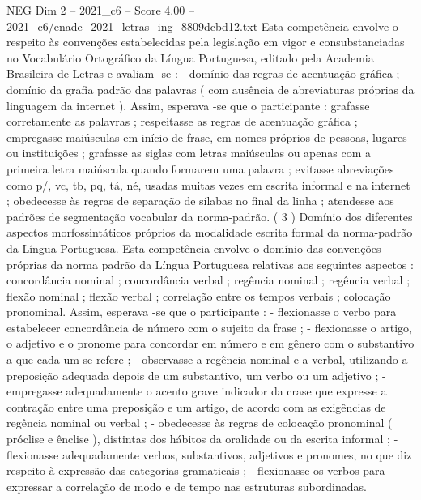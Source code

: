 \begin{textsample}{NEG Dim 2 – 2021\_c6 – Score 4.00 – 2021\_c6/enade\_2021\_letras\_ing\_8809dcbd12.txt}
Esta competência envolve o respeito às convenções estabelecidas pela legislação em vigor e consubstanciadas no Vocabulário Ortográfico da Língua Portuguesa, editado pela Academia Brasileira de Letras e avaliam -se : - domínio das regras de acentuação gráfica ; - domínio da grafia padrão das palavras ( com ausência de abreviaturas próprias da linguagem da internet ).
Assim, esperava -se que o participante : grafasse corretamente as palavras ; respeitasse as regras de acentuação gráfica ; empregasse maiúsculas em início de frase, em nomes próprios de pessoas, lugares ou instituições ; grafasse as siglas com letras maiúsculas ou apenas com a primeira letra maiúscula quando formarem uma palavra ; evitasse abreviações como p/, vc, tb, pq, tá, né, usadas muitas vezes em escrita informal e na internet ; obedecesse às regras de separação de sílabas no final da linha ; atendesse aos padrões de segmentação vocabular da norma-padrão. ( 3 ) Domínio dos diferentes aspectos morfossintáticos próprios da modalidade escrita formal da norma-padrão da Língua Portuguesa.
Esta competência envolve o domínio das convenções próprias da norma padrão da Língua Portuguesa relativas aos seguintes aspectos : concordância nominal ; concordância verbal ; regência nominal ; regência verbal ; flexão nominal ; flexão verbal ; correlação entre os tempos verbais ; colocação pronominal.
Assim, esperava -se que o participante : - flexionasse o verbo para estabelecer concordância de número com o sujeito da frase ; - flexionasse o artigo, o adjetivo e o pronome para concordar em número e em gênero com o substantivo a que cada um se refere ; - observasse a regência nominal e a verbal, utilizando a preposição adequada depois de um substantivo, um verbo ou um adjetivo ; - empregasse adequadamente o acento grave indicador da crase que expresse a contração entre uma preposição e um artigo, de acordo com as exigências de regência nominal ou verbal ; - obedecesse às regras de colocação pronominal ( próclise e ênclise ), distintas dos hábitos da oralidade ou da escrita informal ; - flexionasse adequadamente verbos, substantivos, adjetivos e pronomes, no que diz respeito à expressão das categorias gramaticais ; - flexionasse os verbos para expressar a correlação de modo e de tempo nas estruturas subordinadas.

\end{textsample}
